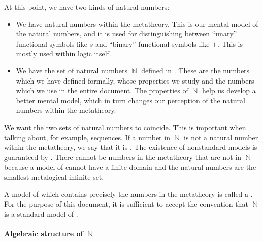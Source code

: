 \begin{remark}\label{rem:standard_models_of_arithmetic}
  At this point, we have two kinds of natural numbers:
  \begin{itemize}
    \item We have natural numbers within the metatheory. This is our mental model of the natural numbers, and it is used for distinguishing between \enquote{unary} functional symbols like \( s \) and \enquote{binary} functional symbols like \( + \). This is mostly used within logic itself.

    \item We have the set of natural numbers \( \BbbN \) defined in . These are the numbers which we have defined formally, whose properties we study and the numbers which we use in the entire document. The properties of \( \BbbN \) help us develop a better mental model, which in turn changes our perception of the natural numbers within the metatheory.
  \end{itemize}

  We want the two sets of natural numbers to coincide. This is important when talking about, for example, \hyperref[def:sequence]{sequences}. If a number in \( \BbbN \) is not a natural number within the metatheory, we say that it is . The existence of nonstandard models is guaranteed by . There cannot be numbers in the metatheory that are not in \( \BbbN \) because a model of  cannot have a finite domain and the natural numbers are the smallest metalogical infinite set.

  A model of  which contains precisely the numbers in the metatheory is called a . For the purpose of this document, it is sufficient to accept the convention that \( \BbbN \) is a standard model of .
\end{remark}

\paragraph{Algebraic structure of \( \BbbN \)}

